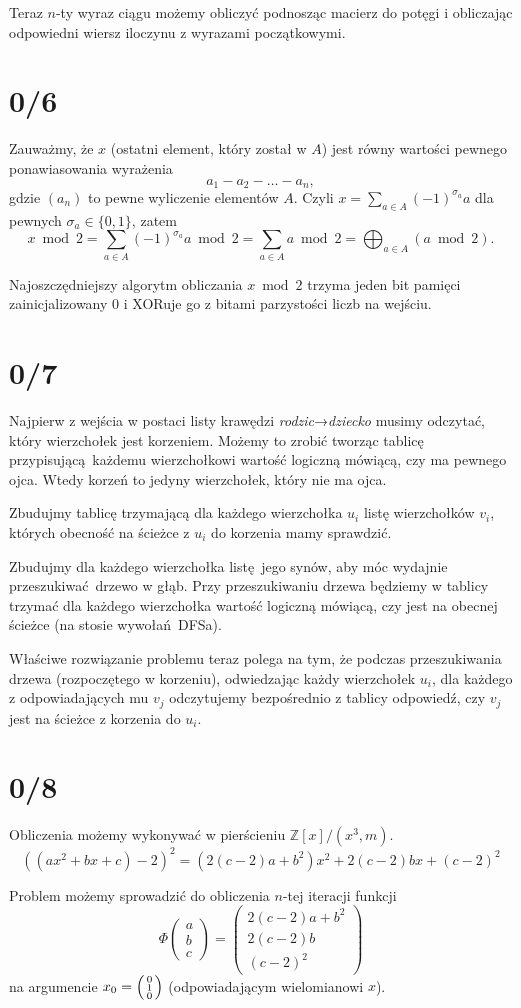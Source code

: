 \documentclass[a4paper, 12pt]{article}
\newcommand{\+}{\enspace}
\begin{document}
Teraz $n$-ty wyraz ciągu możemy obliczyć podnosząc macierz do potęgi i
obliczając odpowiedni wiersz iloczynu z wyrazami początkowymi.


\section*{0/6}
Zauważmy, że $x$ (ostatni element,
który został w $A$) jest równy wartości
pewnego ponawiasowania wyrażenia
$$a_1 - a_2 - … - a_n, $$
gdzie $(a_n)$ to pewne wyliczenie elementów $A$.
Czyli $x = ∑_{a∈A} (-1)^{σ_a} a$ dla pewnych $σ_a ∈ \{ 0, 1 \}$, zatem
$$x \bmod 2 = ∑_{a∈A} (-1)^{σ_a} a \bmod 2 = ∑_{a∈A} a \bmod 2 = \bigoplus_{a∈A} (a \bmod 2).$$

Najoszczędniejszy algorytm obliczania $x \bmod 2$ trzyma jeden bit pamięci
zainicjalizowany $0$ i XORuje go z bitami parzystości liczb na wejściu.

\section*{0/7}
Najpierw z wejścia w postaci listy krawędzi \textit{rodzic}→\textit{dziecko}
musimy odczytać, który wierzchołek jest korzeniem.
Możemy to zrobić tworząc tablicę przypisującą każdemu wierzchołkowi wartość
logiczną mówiącą, czy ma pewnego ojca.
Wtedy korzeń to jedyny wierzchołek, który nie ma ojca.

Zbudujmy tablicę trzymającą dla każdego wierzchołka $u_i$ listę wierzchołków
$v_i$, których obecność na ścieżce z $u_i$ do korzenia mamy sprawdzić.

Zbudujmy dla każdego wierzchołka listę jego synów,
aby móc wydajnie przeszukiwać drzewo w głąb.
Przy przeszukiwaniu drzewa będziemy w tablicy trzymać dla każdego wierzchołka
wartość logiczną mówiącą, czy jest na obecnej ścieżce (na stosie wywołań DFSa).

Właściwe rozwiązanie problemu teraz polega na tym, że podczas przeszukiwania
drzewa (rozpoczętego w korzeniu),
odwiedzając każdy wierzchołek $u_i$, dla każdego z odpowiadających mu $v_j$
odczytujemy bezpośrednio z tablicy odpowiedź,
czy $v_j$ jest na ścieżce z korzenia do $u_i$.


\section*{0/8}
Obliczenia możemy wykonywać w pierścieniu $ℤ[x]/(x^3, m)$.
$$ ((ax^2 + bx + c) - 2)^2 = (2(c-2)a+b^2)x^2 + 2(c-2)bx + (c-2)^2$$

Problem możemy sprowadzić do obliczenia $n$-tej iteracji funkcji
$$Φ\begin{pmatrix}a \\ b \\ c\end{pmatrix}
= \begin{pmatrix}2(c-2)a + b^2 \\ 2(c-2)b \\ (c-2)^2\end{pmatrix}
$$
na argumencie $x_0 = \begin{psmallmatrix}0 \\ 1 \\ 0\end{psmallmatrix}$
(odpowiadającym wielomianowi $x$).
\end{document}
